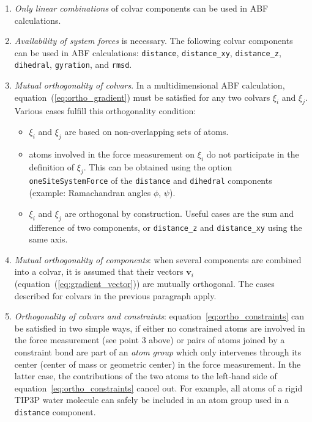 \begin{enumerate}
 \item \emph{Only linear combinations} of colvar components can be used in ABF calculations.
 \item \emph{Availability of system forces} is necessary. The following colvar components
can be used in ABF calculations:
\texttt{distance}, \texttt{distance\_xy}, \texttt{distance\_z}, \texttt{dihedral},
\texttt{gyration}, and \texttt{rmsd}.
 \item \emph{Mutual orthogonality of colvars}. In a multidimensional ABF calculation,
equation~(\ref{eq:ortho_gradient}) must be satisfied for any two colvars $\xi_{i}$ and $\xi_{j}$.
Various cases fulfill this orthogonality condition:
\begin{itemize}
 \item $\xi_{i}$ and $\xi_{j}$ are based on non-overlapping sets of atoms.
 \item atoms involved in the force measurement on $\xi_{i}$ do not participate in
the definition of $\xi_{j}$. This can be obtained using the option \texttt{oneSiteSystemForce}
of the \texttt{distance} and \texttt{dihedral} components (example: Ramachandran angles $\phi$, $\psi$).
 \item $\xi_{i}$ and $\xi_{j}$ are orthogonal by construction. Useful cases are the sum and
difference of two components, or \texttt{distance\_z} and \texttt{distance\_xy} using the same axis.
\end{itemize}
 \item \emph{Mutual orthogonality of components}: when several components are combined into a colvar,
it is assumed that their vectors $\bm{v}_{i}$ (equation~(\ref{eq:gradient_vector}))
are mutually orthogonal. The cases described for colvars in the previous paragraph apply.
 \item \emph{Orthogonality of colvars and constraints}: equation~\ref{eq:ortho_constraints} can
be satisfied in two simple ways, if either no constrained atoms are involved in the force measurement
(see point 3 above) or pairs of atoms joined by a constraint bond are part of an \textit{atom group}
which only intervenes through its center (center of mass or geometric center) in the force measurement.
In the latter case, the contributions of the two atoms to the left-hand side of equation~\ref{eq:ortho_constraints}
cancel out. For example, all atoms of a rigid TIP3P water molecule can safely be included in an atom
group used in a \texttt{distance} component.
\end{enumerate}

